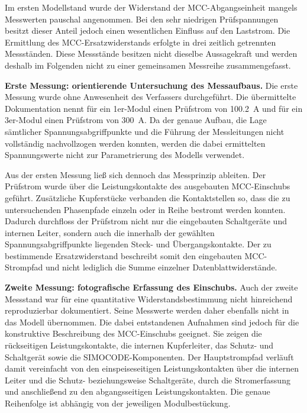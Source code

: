 Im ersten Modellstand wurde der Widerstand der MCC-Abgangseinheit mangels
Messwerten pauschal angenommen. Bei den sehr niedrigen Prüfspannungen besitzt
dieser Anteil jedoch einen wesentlichen Einfluss auf den Laststrom. Die
Ermittlung des MCC-Ersatzwiderstands erfolgte in drei zeitlich getrennten
Messständen. Diese Messstände besitzen nicht dieselbe Aussagekraft und werden
deshalb im Folgenden nicht zu einer gemeinsamen Messreihe zusammengefasst.

\noindent\textbf{Erste Messung: orientierende Untersuchung des Messaufbaus.}
Die erste Messung wurde ohne Anwesenheit des Verfassers durchgeführt. Die
übermittelte Dokumentation nennt für ein 1er-Modul einen Prüfstrom von
\SI{100.2}{\ampere} und für ein 3er-Modul einen Prüfstrom von
\SI{300}{\ampere}. Da der genaue Aufbau, die Lage sämtlicher
Spannungsabgriffpunkte und die Führung der Messleitungen nicht vollständig
nachvollzogen werden konnten, werden die dabei ermittelten Spannungswerte
nicht zur Parametrierung des Modells verwendet.

Aus der ersten Messung ließ sich dennoch das Messprinzip ableiten. Der
Prüfstrom wurde über die Leistungskontakte des
ausgebauten MCC-Einschubs geführt. Zusätzliche Kupferstücke verbanden die
    Kontaktstellen so, dass die zu untersuchenden Phasenpfade einzeln oder in
Reihe bestromt werden konnten. Dadurch durchfloss der Prüfstrom nicht nur die
eingebauten Schaltgeräte und internen Leiter, sondern auch die innerhalb der
gewählten Spannungs\-abgriffpunkte liegenden Steck- und
Übergangs\-kontakte. Der
zu bestimmende Ersatzwiderstand beschreibt somit den eingebauten
MCC-Strompfad und nicht lediglich die Summe einzelner
Datenblatt\-widerstände.

\noindent\textbf{Zweite Messung: fotografische Erfassung des Einschubs.}
Auch der zweite Messstand war für eine quantitative Widerstandsbestimmung
nicht hinreichend reproduzierbar dokumentiert. Seine Messwerte werden daher
ebenfalls nicht in das Modell übernommen. Die dabei entstandenen Aufnahmen
sind jedoch für die konstruktive Beschreibung des MCC-Einschubs geeignet.
Sie zeigen die rückseitigen Leistungskontakte, die internen Kupferleiter, das
Schutz- und Schaltgerät sowie die SIMOCODE-Komponenten. Der Hauptstrompfad
verläuft damit vereinfacht von den einspeiseseitigen Leistungskontakten über
die internen Leiter und die Schutz- beziehungsweise Schaltgeräte, durch die
Stromerfassung und anschließend zu den abgangsseitigen Leistungskontakten.
Die genaue Reihenfolge ist abhängig von der jeweiligen Modulbestückung.

